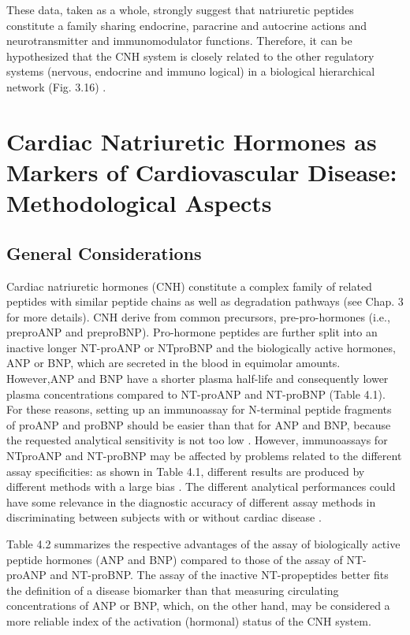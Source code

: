 \documentclass[14pt,a4paper,onecolumn]{extarticle}
\begin{document}
These data, taken as a whole, strongly suggest that natriuretic peptides constitute a family sharing endocrine, paracrine and autocrine actions and neurotransmitter and immunomodulator functions. Therefore, it can be hypothesized that the CNH system is closely related to the other regulatory systems (nervous, endocrine and immuno logical) in a biological hierarchical network (Fig. 3.16) \citep{287} \citep{288}.

\section{Cardiac Natriuretic Hormones as Markers of Cardiovascular Disease: Methodological Aspects}

\subsection{ General Considerations}

Cardiac natriuretic hormones (CNH) constitute a complex family of related peptides with
similar peptide chains as well as degradation pathways (see Chap. 3 for more details).
CNH derive from common precursors, pre-pro-hormones (i.e., preproANP and preproBNP). Pro-hormone peptides are further split into an inactive longer NT-proANP or NTproBNP and the biologically active hormones, ANP or BNP, which are secreted in the
blood in equimolar amounts. However,ANP and BNP have a shorter plasma half-life and
consequently lower plasma concentrations compared to NT-proANP and NT-proBNP
(Table 4.1). For these reasons, setting up an immunoassay for N-terminal peptide fragments of proANP and proBNP should be easier than that for ANP and BNP, because
the requested analytical sensitivity is not too low \citep{bib21}. However, immunoassays for NTproANP and NT-proBNP may be affected by problems related to the different assay
specificities: as shown in Table 4.1, different results are produced by different methods
with a large bias \citep{bib21} \citep{bib22} \citep{bib23}. The different analytical performances could have some relevance in the diagnostic accuracy of different assay methods in discriminating between
subjects with or without cardiac disease \citep{bib21} \citep{bib22} \citep{bib23} \citep{bib24} \citep{bib25} \citep{bib26} \citep{bib27} \citep{bib28} \citep{bib29} \citep{bib210} \citep{bib211}.

Table 4.2 summarizes the respective advantages of the assay of biologically active
peptide hormones (ANP and BNP) compared to those of the assay of NT-proANP and
NT-proBNP. The assay of the inactive NT-propeptides better fits the definition of a disease biomarker than that measuring circulating concentrations of ANP or BNP, which,
on the other hand, may be considered a more reliable index of the activation (hormonal) status of the CNH system.
\end{document}

